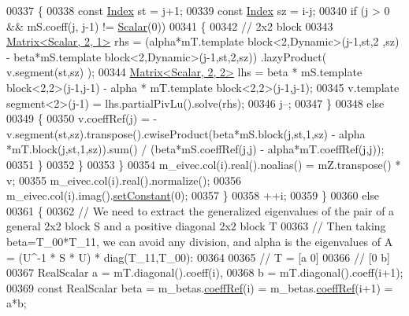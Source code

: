 \begin{DoxyCode}
{00337             \{
00338               \textcolor{keyword}{const} \hyperlink{group___eigenvalues___module_a46a0ff3841059479ec314e56a5645302}{Index} st = j+1;
00339               \textcolor{keyword}{const} \hyperlink{group___eigenvalues___module_a46a0ff3841059479ec314e56a5645302}{Index} sz = i-j;
00340               \textcolor{keywordflow}{if} (j > 0 && mS.coeff(j, j-1) != \hyperlink{group___eigenvalues___module_afb318d0b097ff8dd5a7410d31317ca47}{Scalar}(0))
00341               \{
00342                 \textcolor{comment}{// 2x2 block}
00343                 \hyperlink{group___core___module_class_eigen_1_1_matrix}{Matrix<Scalar, 2, 1>} rhs = (alpha*mT.template block<2,Dynamic>(j-1,st,2
      ,sz) - beta*mS.template block<2,Dynamic>(j-1,st,2,sz)) .lazyProduct( v.segment(st,sz) );
00344                 \hyperlink{group___core___module_class_eigen_1_1_matrix}{Matrix<Scalar, 2, 2>} lhs = beta * mS.template block<2,2>(j-1,j-1) - 
      alpha * mT.template block<2,2>(j-1,j-1);
00345                 v.template segment<2>(j-1) = lhs.partialPivLu().solve(rhs);
00346                 j--;
00347               \}
00348               \textcolor{keywordflow}{else}
00349               \{
00350                 v.coeffRef(j) = -v.segment(st,sz).transpose().cwiseProduct(beta*mS.block(j,st,1,sz) - alpha
      *mT.block(j,st,1,sz)).sum() / (beta*mS.coeffRef(j,j) - alpha*mT.coeffRef(j,j));
00351               \}
00352             \}
00353           \}
00354           m\_eivec.col(i).real().noalias() = mZ.transpose() * v;
00355           m\_eivec.col(i).real().normalize();
00356           m\_eivec.col(i).imag().\hyperlink{class_eigen_1_1_plain_object_base_ac8dea1df3d92b752cc683ff42abf6f9b}{setConstant}(0);
00357         \}
00358         ++i;
00359       \}
00360       \textcolor{keywordflow}{else}
00361       \{
00362         \textcolor{comment}{// We need to extract the generalized eigenvalues of the pair of a general 2x2 block S and a
       positive diagonal 2x2 block T}
00363         \textcolor{comment}{// Then taking beta=T\_00*T\_11, we can avoid any division, and alpha is the eigenvalues of A = (U^-1
       * S * U) * diag(T\_11,T\_00):}
00364 
00365         \textcolor{comment}{// T =  [a 0]}
00366         \textcolor{comment}{//      [0 b]}
00367         RealScalar a = mT.diagonal().coeff(i),
00368                    b = mT.diagonal().coeff(i+1);
00369         \textcolor{keyword}{const} RealScalar beta = m\_betas.\hyperlink{class_eigen_1_1_plain_object_base_a25626a55b26a4323565f79d1b7c48ea8}{coeffRef}(i) = m\_betas.\hyperlink{class_eigen_1_1_plain_object_base_a25626a55b26a4323565f79d1b7c48ea8}{coeffRef}(i+1) = a*b;
}
\end{DoxyCode}
